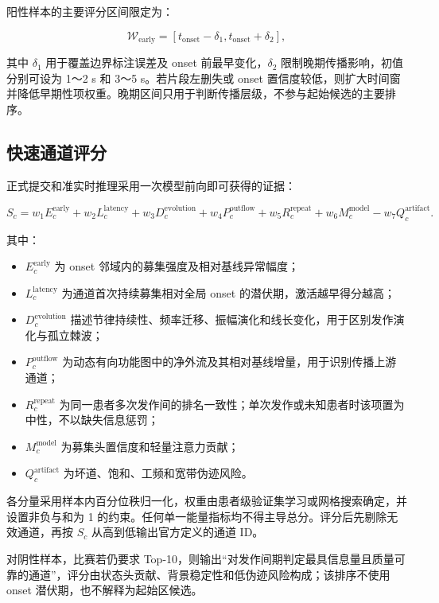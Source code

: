 阳性样本的主要评分区间限定为：

$$
\mathcal{W}_{\mathrm{early}}=
[t_{\mathrm{onset}}-\delta_1,
t_{\mathrm{onset}}+\delta_2],
$$

其中 $\delta_1$ 用于覆盖边界标注误差及 onset 前最早变化，$\delta_2$ 限制晚期传播影响，初值分别可设为 1～2 s 和 3～5 s。若片段左删失或 onset 置信度较低，则扩大时间窗并降低早期性项权重。晚期区间只用于判断传播层级，不参与起始候选的主要排序。

\subsection{快速通道评分}

正式提交和准实时推理采用一次模型前向即可获得的证据：

$$
S_c=
w_1E_c^{\mathrm{early}}
+w_2L_c^{\mathrm{latency}}
+w_3D_c^{\mathrm{evolution}}
+w_4P_c^{\mathrm{outflow}}
+w_5R_c^{\mathrm{repeat}}
+w_6M_c^{\mathrm{model}}
-w_7Q_c^{\mathrm{artifact}}.
$$

其中：

\begin{itemize}[leftmargin=2em,itemsep=0.2em]
    \item $E_c^{\mathrm{early}}$ 为 onset 邻域内的募集强度及相对基线异常幅度；
    \item $L_c^{\mathrm{latency}}$ 为通道首次持续募集相对全局 onset 的潜伏期，激活越早得分越高；
    \item $D_c^{\mathrm{evolution}}$ 描述节律持续性、频率迁移、振幅演化和线长变化，用于区别发作演化与孤立棘波；
    \item $P_c^{\mathrm{outflow}}$ 为动态有向功能图中的净外流及其相对基线增量，用于识别传播上游通道；
    \item $R_c^{\mathrm{repeat}}$ 为同一患者多次发作间的排名一致性；单次发作或未知患者时该项置为中性，不以缺失信息惩罚；
    \item $M_c^{\mathrm{model}}$ 为募集头置信度和轻量注意力贡献；
    \item $Q_c^{\mathrm{artifact}}$ 为坏道、饱和、工频和宽带伪迹风险。
\end{itemize}

各分量采用样本内百分位秩归一化，权重由患者级验证集学习或网格搜索确定，并设置非负与和为 1 的约束。任何单一能量指标均不得主导总分。评分后先剔除无效通道，再按 $S_c$ 从高到低输出官方定义的通道 ID。

对阴性样本，比赛若仍要求 Top-10，则输出“对发作间期判定最具信息量且质量可靠的通道”，评分由状态头贡献、背景稳定性和低伪迹风险构成；该排序不使用 onset 潜伏期，也不解释为起始区候选。

